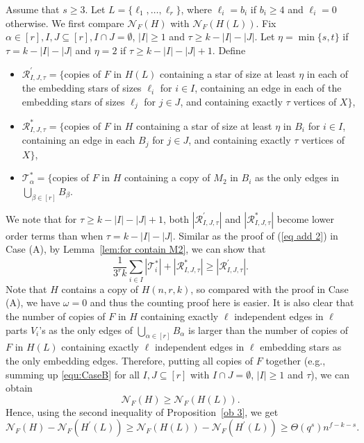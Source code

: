 \documentclass[10pt]{article}
\begin{document}
Assume that $s\geq 3$.
Let $L=\{\ell_1, \ldots, \ell_{r}\}$, where $\ell_i=b_i$ if $b_i\geq 4$ and  $\ell_i=0$ otherwise.
We first compare $\mathcal{N}_F(H)$ with $\mathcal{N}_F(H(L))$.
Fix $\alpha\in [r], I,J\subseteq [r],I\cap J=\emptyset$, $|I|\geq 1$ and $\tau\geq k-|I|-|J|$.
Let $\eta=\min\{s,t\}$ if $\tau=k-|I|-|J|$ and $\eta=2$ if $\tau\geq k-|I|-|J|+1$.
Define
\begin{itemize}
\item  $\mathcal{R}^\prime_{I,J,\tau}=\{$copies of $F$ in $H(L)$ containing a star of size at least $\eta$
     in each of the embedding stars of sizes $\ell_i$ for $i\in I$, containing an edge in each of the embedding stars of sizes $\ell_j$ for $j\in J$, and containing exactly $\tau$ vertices of $X\}$,
\item  $\mathcal{R}^\ast_{I,J,\tau}=\{$copies of $F$ in $H$ containing a star of size at least $\eta$ in $B_i$ for $i\in I$, containing an edge in each $B_j$ for $j\in J$, and containing exactly $\tau$ vertices of $X\}$,
\item  $\mathcal{T}^\ast_\alpha=\{$copies of $F$ in $H$ containing a copy of $M_2$ in $B_i$ as the only edges in $\bigcup_{\beta\in [r]} B_\beta$.
\end{itemize}
We note that for $\tau\geq k-|I|-|J|+1$, both $|\mathcal{R}^\prime_{I,J,\tau}|$ and $|\mathcal{R}^\ast_{I,J,\tau}|$ become lower order terms than when $\tau=k-|I|-|J|$.
Similar as the proof of (\ref{eq add 2}) in Case (A), by Lemma~\ref{lem:for contain M2},
we can show that
\begin{equation}\label{equ:CaseB}
\frac{1}{3^{r}k}\sum_{i\in I}|\mathcal{T}^\ast_{i}|+  |\mathcal{R}^\ast_{I,J,\tau}|\geq |\mathcal{R}^\prime_{I,J,\tau}|.
\end{equation}
Note that $H$ contains a copy of $H(n,r,k)$, so compared with the proof in Case (A), we have $\omega=0$ and thus the counting proof here is easier.
It is also clear that the number of copies of $F$ in $H$ containing exactly $\ell$ independent edges in $\ell$ parts $V_i$'s as the only edges of $\bigcup_{\alpha\in [r]} B_\alpha$ is larger than the number of copies of $F$ in $H(L)$ containing exactly $\ell$ independent edges in $\ell$ embedding stars as the only embedding edges.
Therefore, putting all copies of $F$ together (e.g., summing up \eqref{equ:CaseB} for all $I,J\subseteq [r]$ with $I\cap J=\emptyset$, $|I|\geq 1$ and $\tau$),
we can obtain $$\mathcal{N}_F(H)\geq \mathcal{N}_F(H(L)).$$
Hence, using the second inequality of Proposition~\ref{ob 3}, we get
$$\mathcal{N}_F(H)-\mathcal{N}_F(H^\prime(L))\geq \mathcal{N}_F(H(L))-\mathcal{N}_F(H^\prime(L))\geq \Theta(q^s)n^{f-k-s}.$$
\end{document}
